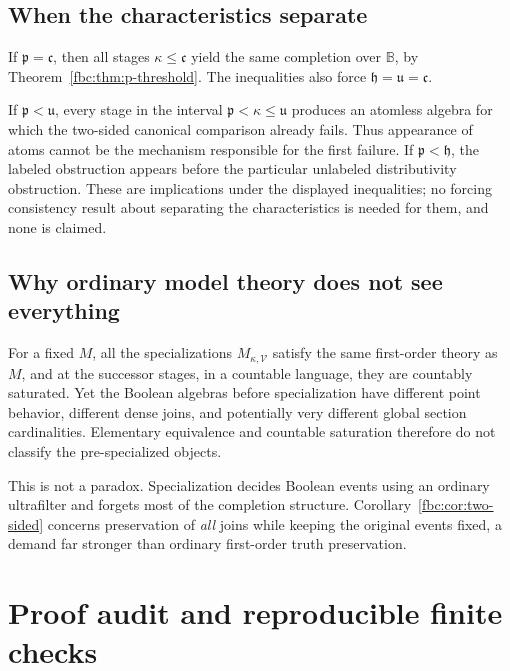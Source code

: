 \documentclass[11pt,letterpaper]{article}
\theoremstyle{definition}
\theoremstyle{remark}
\newcommand{\B}{\mathbb B}
\newcommand{\cp}{\mathfrak p}
\newcommand{\cu}{\mathfrak u}
\newcommand{\cc}{\mathfrak c}
\newcommand{\ch}{\mathfrak h}
\newcommand{\cV}{\mathcal V}
\begin{document}
\subsection{When the characteristics separate}
If $\cp=\cc$, then all stages $\kappa\leq\cc$ yield the same completion
over $\B$, by Theorem~\ref{fbc:thm:p-threshold}. The inequalities also
force $\ch=\cu=\cc$.

If $\cp<\cu$, every stage in the interval $\cp<\kappa\leq\cu$ produces
an atomless algebra for which the two-sided canonical comparison already
fails. Thus appearance of atoms cannot be the mechanism responsible for
the first failure. If $\cp<\ch$, the labeled obstruction appears before
the particular unlabeled distributivity obstruction. These are
implications under the displayed inequalities; no forcing consistency
result about separating the characteristics is needed for them, and none
is claimed.

\subsection{Why ordinary model theory does not see everything}
For a fixed $M$, all the specializations $M_{\kappa,\cV}$ satisfy the
same first-order theory as $M$, and at the successor stages, in a
countable language, they are countably saturated. Yet the Boolean
algebras before specialization have different point behavior, different
dense joins, and potentially very different global section
cardinalities. Elementary equivalence and countable saturation therefore
do not classify the pre-specialized objects.

This is not a paradox. Specialization decides Boolean events using an
ordinary ultrafilter and forgets most of the completion structure.
Corollary~\ref{fbc:cor:two-sided} concerns preservation of \emph{all}
joins while keeping the original events fixed, a demand far stronger
than ordinary first-order truth preservation.

\section{Proof audit and reproducible finite checks}
\label{fbc:sec:audit}
\end{document}
